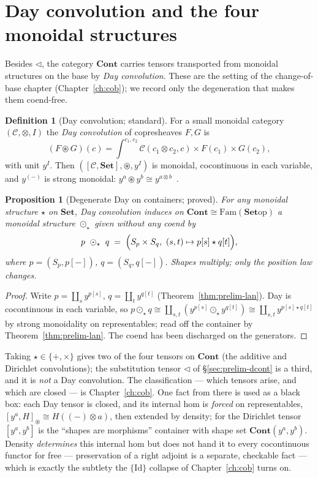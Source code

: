 \documentclass[11pt]{report}
\theoremstyle{plain}
\newtheorem{proposition}[theorem]{Proposition}
\theoremstyle{definition}
\newtheorem{definition}[theorem]{Definition}
\theoremstyle{remark}
\newcommand{\Cont}{\mathbf{Cont}}
\newcommand{\Fam}{\mathrm{Fam}}
\newcommand{\tri}{\triangleleft}
\newcommand{\op}{\mathrm{op}}
\newcommand{\Set}{\mathbf{Set}}
\newcommand{\yy}{y^{(-)}}
\newcommand{\Day}{\circledast}
\newcommand{\Dayc}{\odot}
\newcommand{\iso}{\cong}
\begin{document}
\section{Day convolution and the four monoidal structures}
\label{sec:prelim-day}

Besides $\tri$, the category $\Cont$ carries tensors transported from monoidal
structures on the base by \emph{Day convolution}. These are the setting of the
change-of-base chapter (Chapter~\ref{ch:cob}); we record only the degeneration
that makes them coend-free.

\begin{definition}[Day convolution; standard]
\label{def:prelim-day}
For a small monoidal category $(\mathcal C,\otimes,I)$ the \emph{Day convolution}
of copresheaves $F,G$ is
\[
  (F\Day G)(c)=\int^{c_1,c_2}\mathcal C(c_1\otimes c_2,c)\times F(c_1)\times G(c_2),
\]
with unit $y^{I}$. Then $([\mathcal C,\Set],\Day,y^{I})$ is monoidal, cocontinuous
in each variable, and $\yy$ is strong monoidal: $y^{a}\Day y^{b}\iso y^{a\otimes
b}$~\cite{day1970}.
\end{definition}

\begin{proposition}[Degenerate Day on containers; proved]
\label{prop:prelim-degen}
For any monoidal structure $\star$ on $\Set$, Day convolution induces on
$\Cont\iso\Fam(\Set\op)$ a monoidal structure $\Dayc_\star$ given \emph{without any
coend} by
\[
  p\ \Dayc_\star\ q \;=\;\Bigl(S_p\times S_q,\ (s,t)\mapsto p[s]\star q[t]\Bigr),
\]
where $p=(S_p,p[-])$, $q=(S_q,q[-])$. Shapes multiply; only the position law
changes.
\end{proposition}

\begin{proof}
Write $p=\coprod_s y^{p[s]}$, $q=\coprod_t y^{q[t]}$
(Theorem~\ref{thm:prelim-lan}). Day is cocontinuous in each variable, so
$p\Dayc_\star q\iso\coprod_{s,t}(y^{p[s]}\Dayc_\star y^{q[t]})
\iso\coprod_{s,t}y^{p[s]\star q[t]}$ by strong monoidality on representables; read
off the container by Theorem~\ref{thm:prelim-lan}. The coend has been discharged
on the generators.
\end{proof}

Taking $\star\in\{+,\times\}$ gives two of the four tensors on $\Cont$ (the
additive and Dirichlet convolutions); the substitution tensor $\tri$ of
\S\ref{sec:prelim-dcont} is a third, and it is \emph{not} a Day convolution. The
classification --- which tensors arise, and which are closed --- is
Chapter~\ref{ch:cob}. One fact from there is used as a black box: each Day tensor
is closed, and its internal hom is \emph{forced} on representables,
$[y^{a},H]_{\Day}\iso H((-)\otimes a)$, then extended by density; for the
Dirichlet tensor $[y^{a},y^{b}]$ is the ``shapes are morphisms'' container with
shape set $\Cont(y^{a},y^{b})$. Density \emph{determines} this internal hom but
does not hand it to every cocontinuous functor for free --- preservation of a
right adjoint is a separate, checkable fact --- which is exactly the subtlety the
$\{\mathrm{Id}\}$ collapse of Chapter~\ref{ch:cob} turns on.
\end{document}
